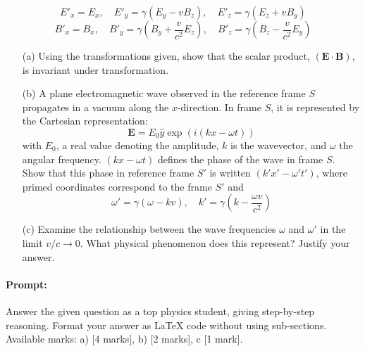 \documentclass{article}
\begin{document}
\[
E'_x = E_x, \quad E'_y = \gamma (E_y - v B_z), \quad E'_z = \gamma (E_z + v B_y)
\]
\[
B'_x = B_x, \quad B'_y = \gamma \left( B_y + \frac{v}{c^2} E_z \right), \quad B'_z = \gamma \left( B_z - \frac{v}{c^2} E_y \right)
\]

\begin{enumerate}
    \item[(a)] Using the transformations given, show that the scalar product, \( (\mathbf{E} \cdot \mathbf{B}) \), is invariant under transformation.
    
    \item[(b)] A plane electromagnetic wave observed in the reference frame \( S \) propagates in a vacuum along the \( x \)-direction. In frame \( S \), it is represented by the Cartesian representation:
    \[
    \mathbf{E} = E_0 \hat{y} \exp \left( i (k x - \omega t) \right)
    \]
    with \( E_0 \), a real value denoting the amplitude, \( k \) is the wavevector, and \( \omega \) the angular frequency. \( (kx - \omega t) \) defines the phase of the wave in frame \( S \). Show that this phase in reference frame \( S' \) is written \( (k' x' - \omega' t') \), where primed coordinates correspond to the frame \( S' \) and 
    \[
    \omega' = \gamma (\omega - k v), \quad k' = \gamma \left( k - \frac{\omega v}{c^2} \right)
    \]

    \item[(c)] Examine the relationship between the wave frequencies \( \omega \) and \( \omega' \) in the limit \( v / c \to 0 \). What physical phenomenon does this represent? Justify your answer.
\end{enumerate}


\paragraph{Prompt: \\} 
Answer the given question as a top physics student, giving step-by-step reasoning. Format your answer as LaTeX code without using sub-sections. Available marks: a) [4 marks], b) [2 marks], c [1 mark].
\end{document}
